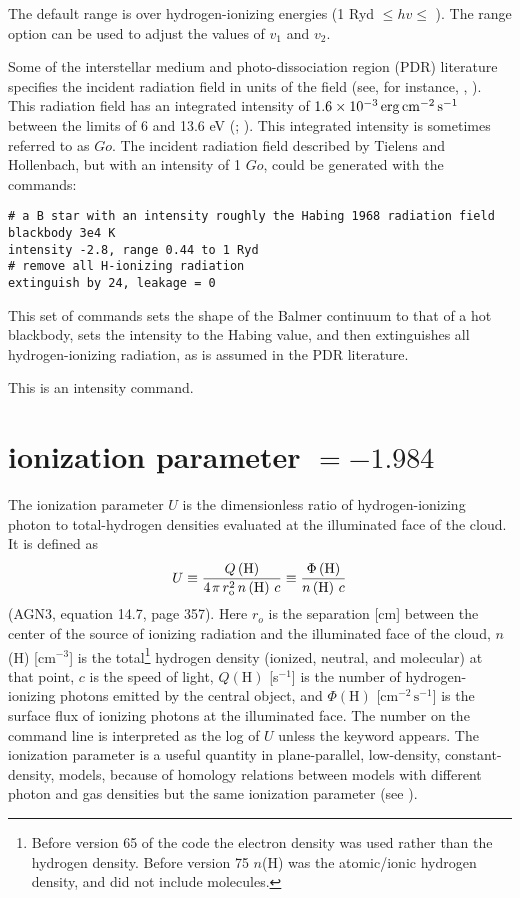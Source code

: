 The default range is over hydrogen-ionizing energies
(1 Ryd  $\le hv\le$ \egamry ).
The range option can be used to adjust
the values of $v_1$ and $v_2$.

Some of the interstellar medium and photo-dissociation region (PDR)
literature specifies the incident radiation field in units of the
\citet{Habing1968} field (see, for instance, \citealp{Tielens1985a},
\citealp{Tielens1985b}).
This
radiation field has an integrated intensity of
$1.6\times 10^{-3} \mbox{${\rm\thinspace erg}{\rm\thinspace cm}^{-2}{\rm\thinspace s}^{-1}\,$}$ between
the limits of 6 and 13.6 eV (\citealp{Tielens1985a}; \citealp{Hollenbach1991}).
This integrated intensity is sometimes referred
to as $Go$.
The incident radiation field described by Tielens and Hollenbach,
but with an
intensity of 1 $Go$, could be generated with the commands:
\begin{verbatim}
# a B star with an intensity roughly the Habing 1968 radiation field
blackbody 3e4 K
intensity -2.8, range 0.44 to 1 Ryd
# remove all H-ionizing radiation
extinguish by 24, leakage = 0
\end{verbatim}
This set of commands sets the shape of the Balmer continuum to
that of a hot blackbody, sets the intensity to the Habing value,
and then extinguishes
all hydrogen-ionizing radiation,
as is assumed in the PDR literature.

This is an intensity command.

\section{ionization parameter $= -1.984$}

The ionization parameter $U$ is the dimensionless ratio of hydrogen-ionizing
photon to total-hydrogen densities evaluated at the illuminated face of the cloud.  
It is defined as
\begin{equation}
U \equiv \frac{{Q\left( {\mathrm{H}} \right)}}{{4{\kern 1pt} \pi \,r_{\mathrm{o}}^2
\,n\left( {\mathrm{H}} \right)\,c}} \equiv \frac{{\Phi \left( {\mathrm{H}}
\right)}}{{n\left( {\mathrm{H}} \right)\,c}}%
\end{equation}
(AGN3, equation 14.7, page 357).
Here $r_o$ is the separation [cm] between
the center of the source of ionizing radiation and the illuminated face
of the cloud, $n$(H) [cm$^{-3}$] is the
total\footnote{Before version 65 of the code the
electron density was used rather
than the hydrogen density.
Before version 75 $n$(H) was the atomic/ionic
hydrogen density, and did not include molecules.}
hydrogen density (ionized, neutral,
and molecular) at that point, $c$ is the speed of light,
$Q(\mathrm{H})$ [s$^{-1}$] is the number of
hydrogen-ionizing photons emitted by the central object,
and $\Phi(\mathrm{H})$
[cm$^{-2}\, \mathrm{s}^{-1}$] is the surface flux of ionizing photons at the illuminated face.
The number on the command line is interpreted
as the log of $U$ unless the keyword  appears.
The ionization parameter
is a useful quantity in plane-parallel, low-density, constant-density,
models, because of homology relations between models with different photon
and gas densities but the same ionization parameter (see \citealp{Davidson1977}).

